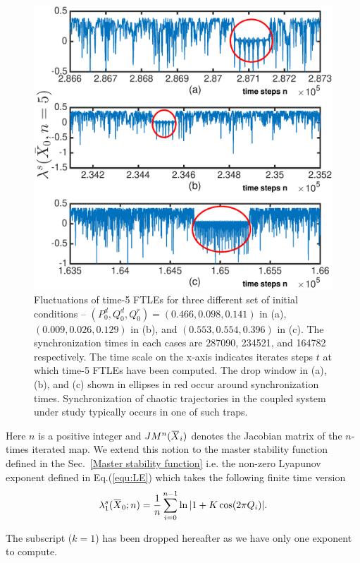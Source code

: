 \documentclass[reprint,amsmath,amssymb,aps,pre]{revtex4-1}
\newcommand{\overbar}[1]{\mkern 1.5mu\overline{\mkern-1.5mu#1\mkern-1.5mu}\mkern 1.5mu}
\begin{document}
\begin{figure}[t!]
	\includegraphics[scale=0.41]{FTLE_plots}
	\caption{\label{fig:FTLE}\footnotesize Fluctuations of time-5 FTLEs for three different set of initial conditions -- $(P^d_0,Q^d_0,Q^r_0) = (0.466,0.098,0.141)$ in (a),  $(0.009,0.026,0.129)$ in (b), and $(0.553,0.554,0.396)$ in (c). The synchronization times in each cases are 287090, 234521, and 164782 respectively. The time scale on the x-axis indicates iterates steps $t$ at which time-5 FTLEs have been computed. The drop window in (a), (b), and (c) shown in ellipses in red occur around synchronization times. Synchronization of chaotic trajectories in the coupled system under study typically occurs in one of such traps.}
\end{figure}

Here $n$ is a positive integer and $JM^n(\overbar{X}_i)$ denotes the Jacobian matrix of the $n$-times iterated map. We extend this notion to the master stability function defined in the Sec.~\ref{Master stability function}  i.e.  the non-zero Lyapunov exponent defined in Eq.(\ref{equ:LE}) 
which takes the following finite time version 
\begin{equation}
\lambda_1^s(\overbar{X}_0;n) = \frac{1}{n}\sum^{n-1}_{i=0}\ln|1 + K \cos (2\pi 
Q_i)|.
\end{equation}

The subscript ($k = 1$) has been dropped hereafter as we have only one 
exponent to compute.
\end{document}
